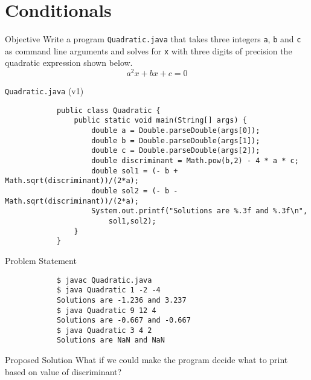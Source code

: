 \documentclass[10pt, compress]{beamer}
\begin{document}
\section{Conditionals}

\begin{slide}
	\begin{block}{Objective}
		Write a program \texttt{Quadratic.java} that takes three integers \texttt{a}, \texttt{b} and \texttt{c} as command line arguments and solves for \texttt{x} with three digits of precision the quadratic expression shown below.
		\begin{equation*}\label{eq1}
			a^2 x + b x + c = 0
		\end{equation*}
	\end{block}
\end{slide}

\begin{slide}
	\begin{block}{\texttt{Quadratic.java} (v1)}
		\begin{verbatim}
			public class Quadratic {
			    public static void main(String[] args) {
			        double a = Double.parseDouble(args[0]);
			        double b = Double.parseDouble(args[1]);
			        double c = Double.parseDouble(args[2]);
			        double discriminant = Math.pow(b,2) - 4 * a * c;
			        double sol1 = (- b + Math.sqrt(discriminant))/(2*a);
			        double sol2 = (- b - Math.sqrt(discriminant))/(2*a);
			        System.out.printf("Solutions are %.3f and %.3f\n",
			            sol1,sol2);
			    }
			}
		\end{verbatim}
	\end{block}
\end{slide}

\begin{slide}
	\begin{block}{Problem Statement}
		\begin{verbatim}
			$ javac Quadratic.java
			$ java Quadratic 1 -2 -4
			Solutions are -1.236 and 3.237
			$ java Quadratic 9 12 4
			Solutions are -0.667 and -0.667
			$ java Quadratic 3 4 2
			Solutions are NaN and NaN
		\end{verbatim}
	\end{block}
	\begin{block}{Proposed Solution}
		What if we could make the program decide what to print based on value of discriminant?
	\end{block}
\end{slide}
\end{document}
